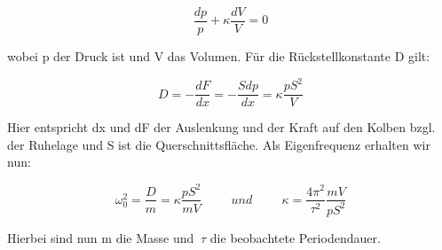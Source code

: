 \documentclass{article}
\begin{document}
{\begin{equation}
\frac{dp}{p}+\kappa \frac{dV}{V}=0
\end{equation}

wobei p der Druck ist und V das Volumen. Für die Rückstellkonstante D gilt:

\begin{equation}
D=-\frac{dF}{dx}=-\frac{Sdp}{dx}=\kappa \frac{pS^2}{V}
\end{equation}

Hier entspricht dx und dF der Auslenkung und der Kraft auf den Kolben bzgl. der Ruhelage und S ist die Querschnittsfläche. Als Eigenfrequenz erhalten wir nun:

\begin{equation}
\label{25}
\omega_{0}^2=\frac{D}{m}=\kappa \frac{pS^2}{mV} \hspace{1cm} und \hspace{1cm} \kappa =\frac{4\pi ^2}{\tau ^2} \frac{mV}{pS^2}
\end{equation}

Hierbei sind nun m die Masse und \(\ \tau\) die beobachtete Periodendauer.

{\begin{center}
\begin{minipage}{\linewidth}
\centering
{}
\label{wtd}
\end{minipage}
\end{center}

\newpage
}}
\end{document}
